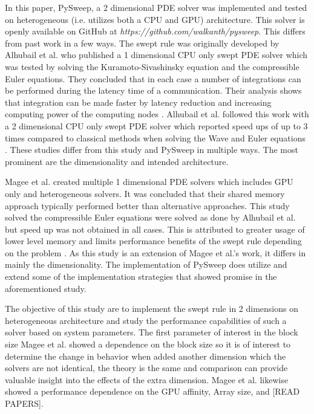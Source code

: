 \documentclass[review]{elsarticle}
\begin{document}
\par
In this paper, PySweep, a 2 dimensional PDE solver was implemented and tested on heterogeneous (i.e. utilizes both a CPU and GPU) architecture. This solver is openly available on GitHub at \textit{https://github.com/walkanth/pysweep}. This differs from past work in a few ways. The swept rule was originally developed by Alhubail et al. who published a 1 dimensional CPU only swept PDE solver which was tested by solving the Kuramoto-Sivashinsky equation and the compressible Euler equations. They concluded that in each case a number of integrations can be performed during the latency time of a communication. Their analysis shows that integration can be made faster by latency reduction and increasing computing power of the computing nodes \cite{alhubail1D}. Alhubail et al. followed this work with a 2 dimensional CPU only swept PDE solver which reported speed ups of up to 3 times compared to classical methods when solving the Wave and Euler equations \cite{alhubail2D}. These studies differ from this study and PySweep in multiple ways. The most prominent are the dimensionality and intended architecture.
\par
Magee et al. created multiple 1 dimensional PDE solvers which includes GPU only and heterogeneous solvers. It was concluded that their shared memory approach typically performed better than alternative approaches. This study solved the compressible Euler equations were solved as done by Alhubail et al. \cite{alhubail1D} but speed up was not obtained in all cases. This is attributed to greater usage of lower level memory and limits performance benefits of the swept rule depending on the problem \cite{Magee2018}. As this study is an extension of Magee et al.'s work, it differs in mainly the dimensionality. The implementation of PySweep does utilize and extend some of the implementation strategies that showed promise in the aforementioned study.

\par
The objective of this study are to implement the swept rule in 2 dimensions on heterogeneous architecture and study the performance capabilities of such a solver based on system parameters. The first parameter of interest in the block size Magee et al. showed a dependence on the block size so it is of interest to determine the change in behavior when added another dimension which the solvers are not identical, the theory is the same and comparison can provide valuable insight into the effects of the extra dimension. Magee et al. likewise showed a performance dependence on the GPU affinity, Array size, and [READ PAPERS].
\end{document}
